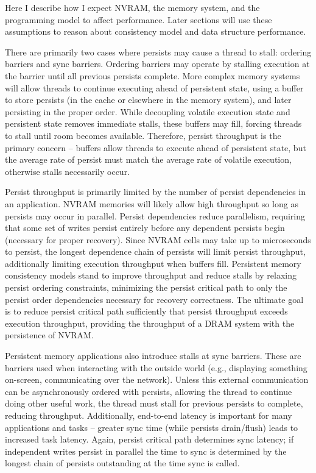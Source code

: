 Here I describe how I expect NVRAM, the memory system, and the programming model to affect performance.
Later sections will use these assumptions to reason about consistency model and data structure performance.

There are primarily two cases where persists may cause a thread to stall: ordering barriers and sync barriers.
Ordering barriers may operate by stalling execution at the barrier until all previous persists complete.
More complex memory systems will allow threads to continue executing ahead of persistent state, using a buffer to store persists (in the cache or elsewhere in the memory system), and later persisting in the proper order.
While decoupling volatile execution state and persistent state removes immediate stalls, these buffers may fill, forcing threads to stall until room becomes available.
Therefore, persist throughput is the primary concern -- buffers allow threads to execute ahead of persistent state, but the average rate of persist must match the average rate of volatile execution, otherwise stalls necessarily occur.

Persist throughput is primarily limited by the number of persist dependencies in an application.
NVRAM memories will likely allow high throughput so long as persists may occur in parallel.
Persist dependencies reduce parallelism, requiring that some set of writes persist entirely before any dependent persists begin (necessary for proper recovery).
Since NVRAM cells may take up to microseconds to persist, the longest dependence chain of persists will limit persist throughput, additionally limiting execution throughput when buffers fill.
Persistent memory consistency models stand to improve throughput and reduce stalls by relaxing persist ordering constraints, minimizing the persist critical path to only the persist order dependencies necessary for recovery correctness.
The ultimate goal is to reduce persist critical path sufficiently that persist throughput exceeds execution throughput, providing the throughput of a DRAM system with the persistence of NVRAM.

Persistent memory applications also introduce stalls at sync barriers.
These are barriers used when interacting with the outside world (e.g., displaying something on-screen, communicating over the network).
Unless this external communication can be asynchronously ordered with persists, allowing the thread to continue doing other useful work, the thread must stall for previous persists to complete, reducing throughput.
Additionally, end-to-end latency is important for many applications and tasks -- greater sync time (while persists drain/flush) leads to increased task latency.
Again, persist critical path determines sync latency; if independent writes persist in parallel the time to sync is determined by the longest chain of persists outstanding at the time sync is called.

